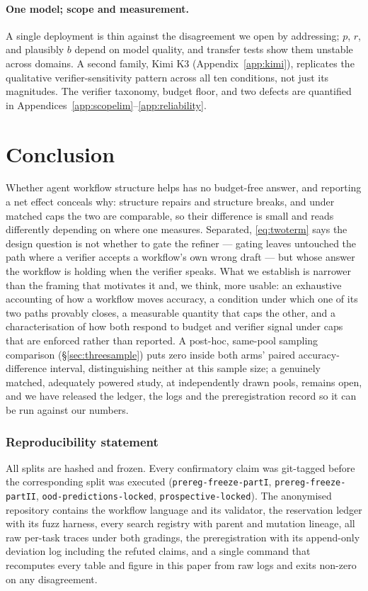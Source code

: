 \documentclass{article}
\newcommand{\rrate}{r}
\newcommand{\brate}{b}
\begin{document}
\paragraph{One model; scope and measurement.} A single deployment is thin
against the disagreement we open by addressing; $p$, $\rrate$, and plausibly
$\brate$ depend on model quality, and transfer tests show them unstable across
domains. A second family, Kimi K3 (Appendix~\ref{app:kimi}), replicates the
qualitative verifier-sensitivity pattern across all ten conditions, not just
its magnitudes. The verifier taxonomy, budget floor, and two defects are
quantified in Appendices~\ref{app:scopelim}--\ref{app:reliability}.

\section{Conclusion}

Whether agent workflow structure helps has no budget-free answer, and reporting
a net effect conceals why: structure repairs and structure breaks, and under
matched caps the two are comparable, so their difference is small and reads
differently depending on where one measures. Separated, \eqref{eq:twoterm} says
the design question is not whether to gate the refiner --- gating leaves untouched
the path where a verifier accepts a workflow's own wrong draft --- but whose
answer the workflow is holding when the verifier speaks. What we establish is
narrower than the framing that motivates it and, we think, more usable: an
exhaustive accounting of how a workflow moves accuracy, a condition under which
one of its two paths provably closes, a measurable quantity that caps the other,
and a characterisation of how both respond to budget and verifier signal under
caps that are enforced rather than reported. A post-hoc, same-pool sampling
comparison (\S\ref{sec:threesample}) puts zero inside both arms' paired
accuracy-difference interval, distinguishing neither at this sample size; a
genuinely matched, adequately powered study, at independently drawn pools,
remains open, and we have released the ledger, the logs and the
preregistration record so it can be run against our numbers.

\subsubsection*{Reproducibility statement}

All splits are hashed and frozen. Every confirmatory claim was git-tagged before
the corresponding split was executed (\texttt{prereg-freeze-partI},
\texttt{prereg-freeze-partII}, \texttt{ood-predictions-locked},
\texttt{prospective-locked}). The anonymised repository contains the workflow
language and its validator, the reservation ledger with its fuzz harness, every
search registry with parent and mutation lineage, all raw per-task traces under
both gradings, the preregistration with its append-only deviation log including
the refuted claims, and a single command that recomputes every table and figure
in this paper from raw logs and exits non-zero on any disagreement.
\end{document}
